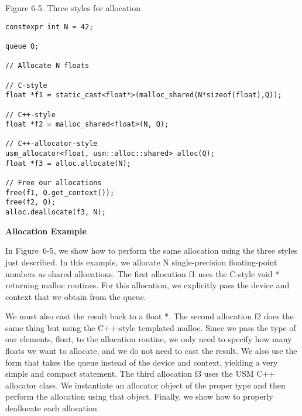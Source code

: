 \hspace*{\fill} \par %
Figure 6-5. Three styles for allocation
\begin{lstlisting}[caption={}]
constexpr int N = 42;

queue Q;

// Allocate N floats

// C-style
float *f1 = static_cast<float*>(malloc_shared(N*sizeof(float),Q));

// C++-style
float *f2 = malloc_shared<float>(N, Q);

// C++-allocator-style
usm_allocator<float, usm::alloc::shared> alloc(Q);
float *f3 = alloc.allocate(N);

// Free our allocations
free(f1, Q.get_context());
free(f2, Q);
alloc.deallocate(f3, N);
\end{lstlisting}

\hspace*{\fill} \par %
\textbf{Allocation Example}

In Figure 6-5, we show how to perform the same allocation using the three styles just described. In this example, we allocate N single-precision floating-point numbers as shared allocations. The first allocation f1 uses the C-style void * returning malloc routines. For this allocation, we explicitly pass the device and context that we obtain from the queue. \par

We must also cast the result back to a float *. The second allocation f2 does the same thing but using the C++-style templated malloc. Since we pass the type of our elements, float, to the allocation routine, we only need to specify how many floats we want to allocate, and we do not need to cast the result. We also use the form that takes the queue instead of the device and context, yielding a very simple and compact statement. The third allocation f3 uses the USM C++ allocator class. We instantiate an allocator object of the proper type and then perform the allocation using that object. Finally, we show how to properly deallocate each allocation.\par












































